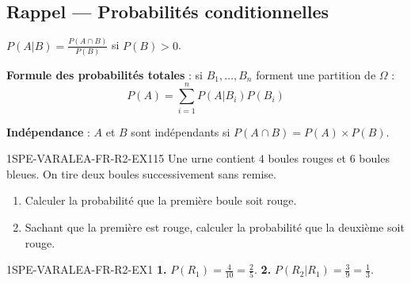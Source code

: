 
\subsection*{Rappel — Probabilités conditionnelles}

$P(A|B) = \frac{P(A \cap B)}{P(B)}$ si $P(B) > 0$.

\textbf{Formule des probabilités totales} : si $B_1, \ldots, B_n$ forment une partition de $\Omega$ :
\[
P(A) = \sum_{i=1}^{n} P(A|B_i) P(B_i)
\]

\textbf{Indépendance} : $A$ et $B$ sont indépendants si $P(A \cap B) = P(A) \times P(B)$.

\begin{exercice}{1SPE-VARALEA-FR-R2-EX1}{1}{5}
Une urne contient $4$ boules rouges et $6$ boules bleues. On tire deux boules successivement sans remise.
\begin{enumerate}
  \item Calculer la probabilité que la première boule soit rouge.
  \item Sachant que la première est rouge, calculer la probabilité que la deuxième soit rouge.
\end{enumerate}
\end{exercice}


\begin{corrige}{1SPE-VARALEA-FR-R2-EX1}
\textbf{1.} $P(R_1) = \frac{4}{10} = \frac{2}{5}$.
\textbf{2.} $P(R_2|R_1) = \frac{3}{9} = \frac{1}{3}$.
\end{corrige}
